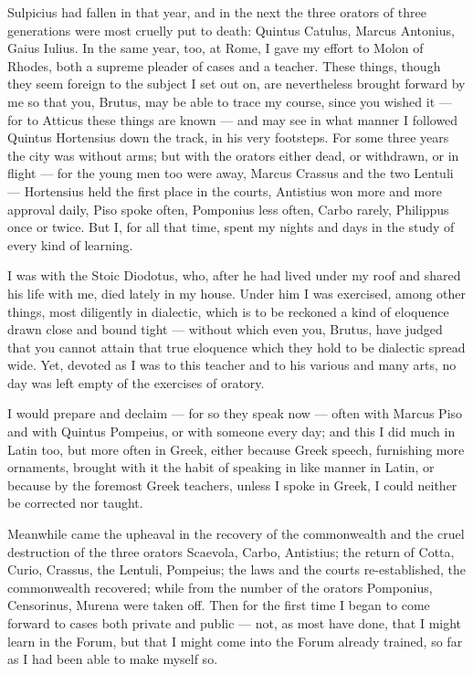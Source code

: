  Sulpicius had fallen in that year, and in the next the three orators of three generations were most cruelly put to death: Quintus Catulus, Marcus Antonius, Gaius Iulius. In the same year, too, at Rome, I gave my effort to Molon of Rhodes, both a supreme pleader of cases and a teacher. These things, though they seem foreign to the subject I set out on, are nevertheless brought forward by me so that you, Brutus, may be able to trace my course, since you wished it — for to Atticus these things are known — and may see in what manner I followed Quintus Hortensius down the track, in his very footsteps. For some three years the city was without arms; but with the orators either dead, or withdrawn, or in flight — for the young men too were away, Marcus Crassus and the two Lentuli — Hortensius held the first place in the courts, Antistius won more and more approval daily, Piso spoke often, Pomponius less often, Carbo rarely, Philippus once or twice. But I, for all that time, spent my nights and days in the study of every kind of learning.

 I was with the Stoic Diodotus, who, after he had lived under my roof and shared his life with me, died lately in my house. Under him I was exercised, among other things, most diligently in dialectic, which is to be reckoned a kind of eloquence drawn close and bound tight — without which even you, Brutus, have judged that you cannot attain that true eloquence which they hold to be dialectic spread wide. Yet, devoted as I was to this teacher and to his various and many arts, no day was left empty of the exercises of oratory.

 I would prepare and declaim — for so they speak now — often with Marcus Piso and with Quintus Pompeius, or with someone every day; and this I did much in Latin too, but more often in Greek, either because Greek speech, furnishing more ornaments, brought with it the habit of speaking in like manner in Latin, or because by the foremost Greek teachers, unless I spoke in Greek, I could neither be corrected nor taught.

 Meanwhile came the upheaval in the recovery of the commonwealth and the cruel destruction of the three orators Scaevola, Carbo, Antistius; the return of Cotta, Curio, Crassus, the Lentuli, Pompeius; the laws and the courts re-established, the commonwealth recovered; while from the number of the orators Pomponius, Censorinus, Murena were taken off. Then for the first time I began to come forward to cases both private and public — not, as most have done, that I might learn in the Forum, but that I might come into the Forum already trained, so far as I had been able to make myself so.

